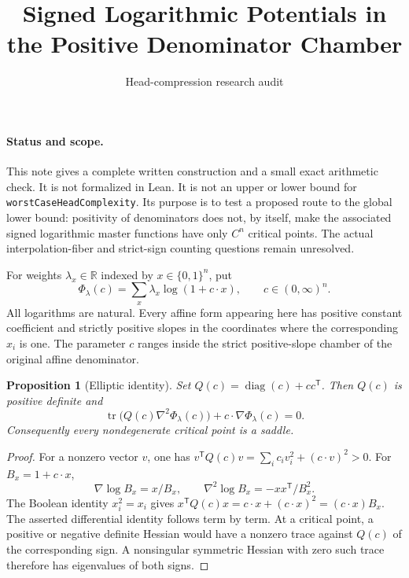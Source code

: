 \documentclass[11pt]{article}
\newtheorem{proposition}{Proposition}
\begin{document}
\title{Signed Logarithmic Potentials in the Positive Denominator Chamber}
\author{Head-compression research audit}
\maketitle

\paragraph{Status and scope.}
This note gives a complete written construction and a small exact arithmetic
check. It is not formalized in Lean. It is not an upper or lower bound for
\texttt{worstCaseHeadComplexity}. Its purpose is to test a proposed route to
the global lower bound: positivity of denominators does not, by itself,
make the associated signed logarithmic master functions have only
$C^n$ critical points. The actual interpolation-fiber and strict-sign
counting questions remain unresolved.

For weights $\lambda_x\in\mathbb R$ indexed by $x\in\{0,1\}^n$, put
\[
 \Phi_\lambda(c)=\sum_x\lambda_x\log(1+c\cdot x),
 \qquad c\in(0,\infty)^n.
\]
All logarithms are natural. Every affine form appearing here has positive
constant coefficient and strictly positive slopes in the coordinates
where the corresponding $x_i$ is one. The parameter $c$ ranges inside
the strict positive-slope chamber of the original affine denominator.

\begin{proposition}[Elliptic identity]
Set $Q(c)=\operatorname{diag}(c)+cc^{\mathsf T}$. Then $Q(c)$ is positive
definite and
\[
 \operatorname{tr}\bigl(Q(c)\nabla^2\Phi_\lambda(c)\bigr)
       +c\cdot\nabla\Phi_\lambda(c)=0.
\]
Consequently every nondegenerate critical point is a saddle.
\end{proposition}
\begin{proof}
For a nonzero vector $v$, one has
$v^{\mathsf T}Q(c)v=\sum_i c_i v_i^2+(c\cdot v)^2>0$.
For $B_x=1+c\cdot x$,
\[
 \nabla\log B_x=x/B_x,\qquad
 \nabla^2\log B_x=-xx^{\mathsf T}/B_x^2.
\]
The Boolean identity $x_i^2=x_i$ gives
$x^{\mathsf T}Q(c)x=c\cdot x+(c\cdot x)^2=(c\cdot x)B_x$.
The asserted differential identity follows term by term. At a critical
point, a positive or negative definite Hessian would have a nonzero trace
against $Q(c)$ of the corresponding sign. A nonsingular symmetric Hessian
with zero such trace therefore has eigenvalues of both signs.
\end{proof}
\end{document}
